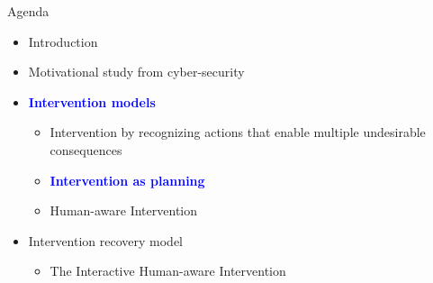 \begin{frame}{Agenda}
\begin{itemize}
\item Introduction
\item Motivational study from cyber-security
\item \textcolor{blue} {\textbf{Intervention models}}
\begin{itemize}
\item Intervention by recognizing actions that enable multiple undesirable consequences
\item \textcolor{blue} {\textbf{Intervention as planning}}
\item Human-aware Intervention
\end{itemize}
\item Intervention recovery model
\begin{itemize}
\item The Interactive Human-aware Intervention
\end{itemize}
\end{itemize}

\end{frame}